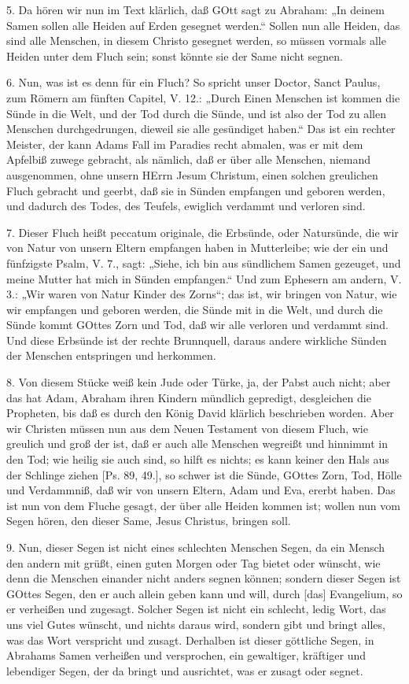 5. Da hören wir nun im Text klärlich, daß GOtt sagt zu Abraham: „In deinem Samen sollen alle Heiden auf Erden gesegnet werden.“ Sollen nun alle Heiden, das sind alle Menschen, in diesem Christo gesegnet werden, so müssen vormals alle Heiden unter dem Fluch sein; sonst könnte sie der Same nicht segnen.

6. Nun, was ist es denn für ein Fluch? So spricht unser Doctor, Sanct Paulus, zum Römern am fünften Capitel, V. 12.: „Durch Einen Menschen ist kommen die Sünde in die Welt, und der Tod durch die Sünde, und ist also der Tod zu allen Menschen durchgedrungen, dieweil sie alle gesündiget haben.“ Das ist ein rechter Meister, der kann Adams Fall im Paradies recht abmalen, was er mit dem Apfelbiß zuwege gebracht, als nämlich, daß er über alle Menschen, niemand ausgenommen, ohne unsern HErrn Jesum Christum, einen solchen greulichen Fluch gebracht und geerbt, daß sie in Sünden empfangen und geboren werden, und dadurch des Todes, des Teufels, ewiglich verdammt und verloren sind.

7. Dieser Fluch heißt peccatum originale, die Erbsünde, oder Natursünde, die wir von Natur von unsern Eltern empfangen haben in
Mutterleibe; wie der ein und fünfzigste Psalm, V. 7., sagt: „Siehe, ich bin aus sündlichem Samen gezeuget, und meine Mutter hat mich in Sünden empfangen.“ Und zum Ephesern am andern, V. 3.: „Wir waren von Natur Kinder des Zorns“; das ist, wir bringen von Natur, wie wir empfangen und geboren werden, die Sünde mit in die Welt, und durch die Sünde kommt GOttes Zorn und Tod, daß wir alle verloren und verdammt sind. Und diese Erbsünde ist der rechte Brunnquell, daraus andere wirkliche Sünden der Menschen entspringen und herkommen.

8. Von diesem Stücke weiß kein Jude oder Türke, ja, der Pabst auch nicht; aber das hat Adam, Abraham ihren Kindern mündlich gepredigt, desgleichen die Propheten, bis daß es durch den König David klärlich beschrieben worden. Aber wir Christen müssen nun aus dem Neuen Testament von diesem Fluch, wie greulich und groß der ist, daß er auch alle Menschen wegreißt und hinnimmt in den Tod; wie heilig sie auch sind, so hilft es nichts; es kann keiner den Hals aus der Schlinge ziehen [Ps. 89, 49.], so schwer ist die Sünde, GOttes Zorn, Tod, Hölle und Verdammniß, daß wir von unsern Eltern, Adam und Eva, ererbt haben. Das ist nun von dem Fluche gesagt, der über alle Heiden kommen ist; wollen nun vom Segen hören, den dieser Same, Jesus Christus, bringen soll.

9. Nun, dieser Segen ist nicht eines schlechten Menschen Segen, da ein Mensch den andern mit grüßt, einen guten Morgen oder Tag bietet oder wünscht, wie denn die Menschen einander nicht anders segnen können; sondern dieser Segen ist GOttes Segen, den er auch allein geben kann und will, durch [das] Evangelium, so er verheißen und zugesagt. Solcher Segen ist nicht ein schlecht, ledig Wort, das uns viel Gutes wünscht, und nichts daraus wird, sondern gibt und bringt alles, was das Wort verspricht und zusagt. Derhalben ist dieser göttliche Segen, in Abrahams Samen verheißen und versprochen, ein gewaltiger, kräftiger und lebendiger Segen, der da bringt und ausrichtet, was er zusagt oder segnet.

